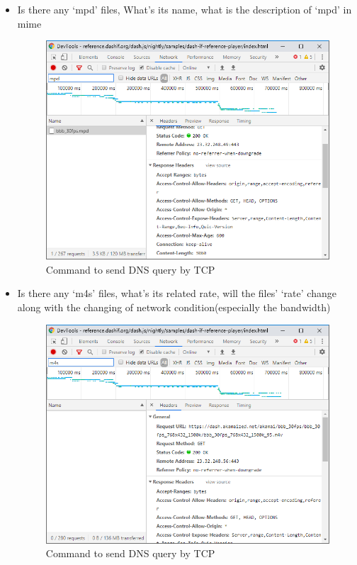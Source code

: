 \documentclass[12pt,letterpaper]{ctexart}
\begin{document}
\begin{itemize}
  \item Is there any `mpd' files, What’s its name, what is the description of `mpd' in mime
  \begin{figure}[H]
    \centering
    \includegraphics[width=0.8\linewidth]{assets/6.1_mpd.png}
    \caption{Command to send DNS query by TCP}
    \label{fig:cmd_tcp}
  \end{figure}
  \item Is there any `m4s' files, what’s its related rate, will the files’ `rate' change along with the changing of network condition(especially the bandwidth)


  \begin{figure}[H]
    \centering
    \includegraphics[width=0.8\linewidth]{assets/6.1_m4s.png}
    \caption{Command to send DNS query by TCP}
    \label{fig:cmd_tcp}
  \end{figure}


\end{itemize}
\end{document}
